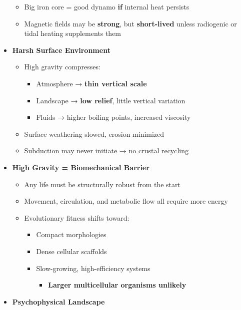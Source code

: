 \documentclass[
  letterpaper,
]{book}
\providecommand{\tightlist}{%
  \setlength{\itemsep}{0pt}\setlength{\parskip}{0pt}}
\begin{document}
\begin{itemize}
  \begin{itemize}
  \tightlist
  \item
    Big iron core = good dynamo \textbf{if} internal heat persists\\
  \item
    Magnetic fields may be \textbf{strong}, but \textbf{short-lived}
    unless radiogenic or tidal heating supplements them
  \end{itemize}
\item
  \textbf{Harsh Surface Environment}

  \begin{itemize}
  \tightlist
  \item
    High gravity compresses:

    \begin{itemize}
    \tightlist
    \item
      Atmosphere → \textbf{thin vertical scale}
    \item
      Landscape → \textbf{low relief}, little vertical variation
    \item
      Fluids → higher boiling points, increased viscosity
    \end{itemize}
  \item
    Surface weathering slowed, erosion minimized
  \item
    Subduction may never initiate → no crustal recycling
  \end{itemize}
\item
  \textbf{High Gravity = Biomechanical Barrier}

  \begin{itemize}
  \tightlist
  \item
    Any life must be structurally robust from the start\\
  \item
    Movement, circulation, and metabolic flow all require more energy\\
  \item
    Evolutionary fitness shifts toward:

    \begin{itemize}
    \tightlist
    \item
      Compact morphologies
    \item
      Dense cellular scaffolds
    \item
      Slow-growing, high-efficiency systems

      \begin{itemize}
      \tightlist
      \item
        \textbf{Larger multicellular organisms unlikely}
      \end{itemize}
    \end{itemize}
  \end{itemize}
\item
  \textbf{Psychophysical Landscape}


\end{itemize}
\end{document}
